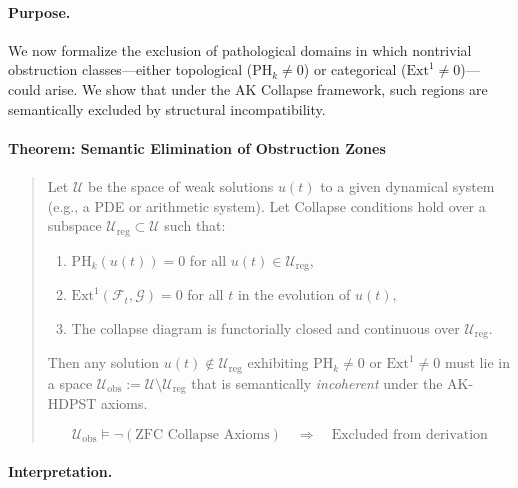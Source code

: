 \documentclass[11pt]{article}
\begin{document}
\begin{axiom}
\begin{axiom}
{{\paragraph{Purpose.}
We now formalize the exclusion of pathological domains in which  
nontrivial obstruction classes—either topological (\(\mathrm{PH}_k \neq 0\))  
or categorical (\(\mathrm{Ext}^1 \neq 0\))—could arise.  
We show that under the AK Collapse framework, such regions are  
semantically excluded by structural incompatibility.

\paragraph{Theorem: Semantic Elimination of Obstruction Zones}

\begin{quote}
Let \( \mathcal{U} \) be the space of weak solutions \( u(t) \)  
to a given dynamical system (e.g., a PDE or arithmetic system).  
Let Collapse conditions hold over a subspace \( \mathcal{U}_{\text{reg}} \subset \mathcal{U} \)  
such that:

\begin{enumerate}
  \item \( \mathrm{PH}_k(u(t)) = 0 \) for all \( u(t) \in \mathcal{U}_{\text{reg}} \),
  \item \( \mathrm{Ext}^1(\mathcal{F}_t, \mathcal{G}) = 0 \) for all \( t \) in the evolution of \( u(t) \),
  \item The collapse diagram is functorially closed and continuous over \( \mathcal{U}_{\text{reg}} \).
\end{enumerate}

Then any solution \( u(t) \notin \mathcal{U}_{\text{reg}} \)  
exhibiting \( \mathrm{PH}_k \neq 0 \) or \( \mathrm{Ext}^1 \neq 0 \)  
must lie in a space \( \mathcal{U}_{\text{obs}} := \mathcal{U} \setminus \mathcal{U}_{\text{reg}} \)  
that is semantically \emph{incoherent} under the AK-HDPST axioms.

\[
\mathcal{U}_{\text{obs}} \models \neg (\text{ZFC Collapse Axioms}) \quad \Rightarrow \quad \text{Excluded from derivation}
\]
\end{quote}

\paragraph{Interpretation.}

}}
\end{axiom}
\end{axiom}
\end{document}
